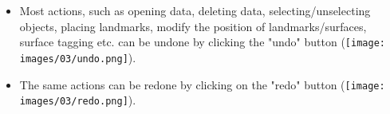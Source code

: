 \begin{itemize}
\item Most actions, such as opening data, deleting data, selecting/unselecting objects, placing landmarks, modify the position of landmarks/surfaces, surface tagging etc. can be undone by clicking the "undo" button (\texttt{[image: images/03/undo.png]}).
\item The same actions can be redone by clicking on the "redo" button (\texttt{[image: images/03/redo.png]}).
\end{itemize}


